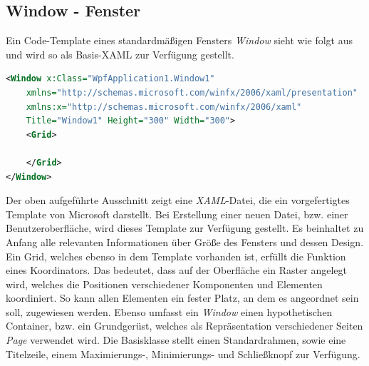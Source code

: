 \subsection*{Window - Fenster}
Ein Code-Template eines standardmäßigen Fensters \textit{Window} sieht wie folgt aus und wird so als Basis-XAML zur Verfügung gestellt.
\begin{lstlisting}[language=XML,
    frame=single,           % Ein Rahmen um den Code
    framexleftmargin=15pt,  % Rahmen link von den Zahlen
    style=algoBericht,
    label={window-template},
    captionpos=b,           % Caption unter den Code setzen
caption={Window-Template}]
<Window x:Class="WpfApplication1.Window1"
    xmlns="http://schemas.microsoft.com/winfx/2006/xaml/presentation"
    xmlns:x="http://schemas.microsoft.com/winfx/2006/xaml"
    Title="Window1" Height="300" Width="300">
    <Grid>

    </Grid>
</Window>
\end{lstlisting}
Der oben aufgeführte Ausschnitt zeigt eine \textit{XAML}-Datei, die ein vorgefertigtes Template von Microsoft darstellt. 
Bei Erstellung einer neuen Datei, bzw. einer Benutzeroberfläche, wird dieses Template zur Verfügung gestellt. Es
beinhaltet zu Anfang alle relevanten Informationen über Größe des Fensters und dessen Design. Ein Grid, 
welches ebenso in dem Template vorhanden ist, erfüllt die Funktion eines Koordinators. Das bedeutet, dass auf der 
Oberfläche ein Raster angelegt wird, welches die Positionen verschiedener Komponenten und Elementen koordiniert. So kann 
allen Elementen ein fester Platz, an dem es angeordnet sein soll, zugewiesen werden.
\linebreak
Ebenso umfasst ein \textit{Window} einen hypothetischen Container, bzw. ein Grundgerüst, welches als Repräsentation 
verschiedener Seiten \textit{Page} verwendet wird. Die Basisklasse stellt einen Standardrahmen, sowie eine Titelzeile, einem 
Maximierungs-, Minimierungs- und Schließknopf zur Verfügung.
